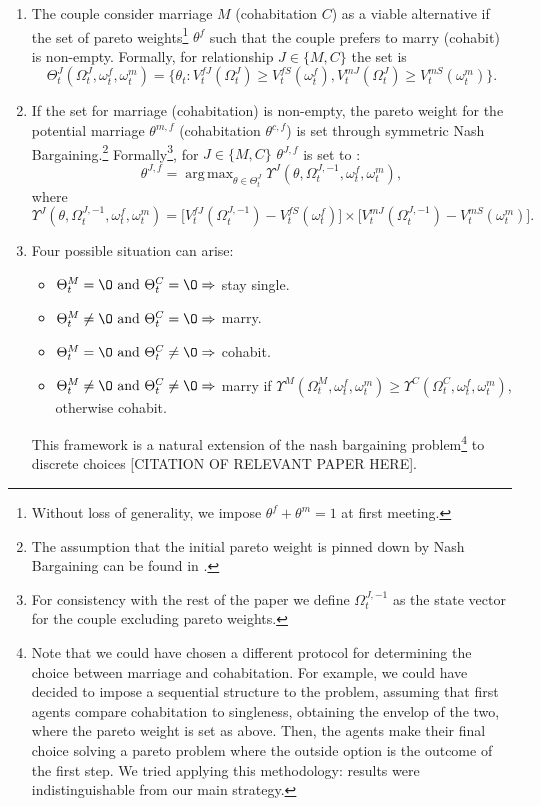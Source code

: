 \documentclass[12pt]{article}
\numberwithin{table}{section}
\DeclareMathOperator*{\argmax}{arg\,max}
\begin{document}
\begin{enumerate}
\item The couple consider marriage $M$ (cohabitation $C$) as a viable alternative if the set of pareto weights\footnote{Without loss of generality, we impose $\theta^f+\theta^m=1$ at first meeting.} $\theta^f$ such that the couple prefers to marry (cohabit) is non-empty. Formally, for relationship $J\in\{M,C\}$ the set is
\begin{equation}\label{eq:set_couple}
\Theta^J_t(\Omega^J_t,\omega^f_t,\omega^m_t)=\big\{\theta_t: V_t^{fJ}(\Omega^J_t)\geq V_t^{fS}(\omega^f_t), V_t^{mJ}(\Omega^J_t)\geq V_t^{mS}(\omega^m_t)\big\}.
\end{equation}
\item If the set for marriage (cohabitation) is non-empty, the pareto weight for the potential marriage $\theta^{m,f}$ (cohabitation $\theta^{c,f}$) is set through symmetric Nash Bargaining.\footnote{The assumption that the initial pareto weight is pinned down by Nash Bargaining can be found in \cite{low2018}.} Formally\footnote{For consistency with the rest of the paper we define $\Omega^{J,-1}_t$ as the state vector for the couple excluding pareto weights.}, for $J\in\{M,C\}$ $\theta^{J,f}$ is set to :
\begin{equation}\label{nash_couple}
\theta^{J,f}= \argmax_{\theta\in\Theta^J_t} \Upsilon^J(\theta,\Omega^{J,-1}_t,\omega^f_t,\omega^m_t),
\end{equation}
where
\begin{equation}
\Upsilon^J(\theta,\Omega^{J,-1}_t,\omega^f_t,\omega^m_t)=\big[V_t^{fJ}(\Omega^{J,-1}_t)- V_t^{fS}(\omega^f_t)\big]\times\big[ V_t^{mJ}(\Omega^{J,-1}_t)- V_t^{mS}(\omega^m_t)\big].
\end{equation}
\item Four possible situation can arise:
\begin{itemize}
\item $\Theta^M_t=\O\text{ and }\Theta^C_t=\O \Rightarrow$ stay single.
\item $\Theta^M_t\neq\O\text{ and }\Theta^C_t=\O \Rightarrow$ marry.
\item $\Theta^M_t=\O\text{ and }\Theta^C_t\neq\O \Rightarrow$ cohabit.
\item $\Theta^M_t\neq\O\text{ and }\Theta^C_t\neq\O \Rightarrow$ marry if $ \Upsilon^M(\Omega^M_t,\omega^f_t,\omega^m_t)\geq\Upsilon^C(\Omega^C_t,\omega^f_t,\omega^m_t)$, otherwise cohabit.
\end{itemize}
This framework is a natural extension of the nash bargaining problem\footnote{Note that we could have chosen a different protocol for determining the choice between marriage and cohabitation. For example, we could have decided to impose a sequential structure to the problem, assuming that first agents compare cohabitation to singleness, obtaining the envelop of the two, where the pareto weight is set as above. Then, the agents make their final choice solving a pareto problem where the outside option is the outcome of the first step. We tried applying this methodology: results were indistinguishable from our main strategy.} to discrete choices [CITATION OF RELEVANT PAPER HERE].
\end{enumerate}
\end{document}
